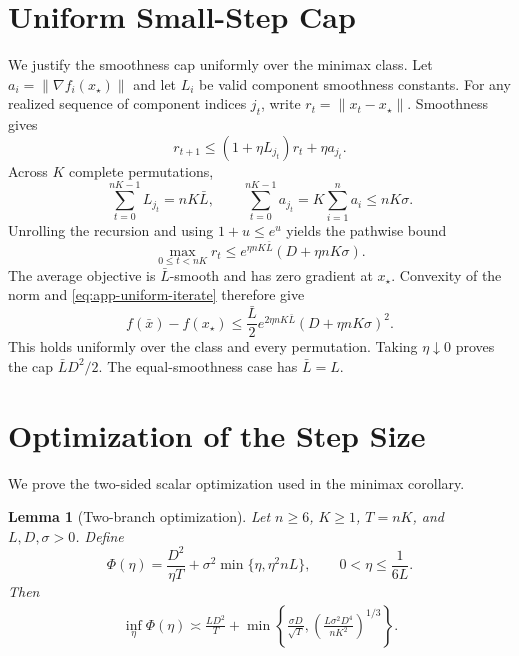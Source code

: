 \documentclass[twoside]{article}
\newtheorem{lemma}[theorem]{Lemma}
\begin{document}
\section{Uniform Small-Step Cap}
\label{app:cap}

We justify the smoothness cap uniformly over the minimax class. Let
$a_i=\|\nabla f_i(x_\star)\|$ and let $L_i$ be valid component smoothness
constants. For any realized sequence of component indices $j_t$, write
$r_t=\|x_t-x_\star\|$. Smoothness gives
\begin{equation}
 r_{t+1}\le(1+\eta L_{j_t})r_t+\eta a_{j_t}.
\end{equation}
Across $K$ complete permutations,
\begin{equation}
 \sum_{t=0}^{nK-1}L_{j_t}=nK\bar L,
 \qquad
 \sum_{t=0}^{nK-1}a_{j_t}
 =K\sum_{i=1}^na_i\le nK\sigma.
\end{equation}
Unrolling the recursion and using $1+u\le e^u$ yields the pathwise bound
\begin{equation}
 \max_{0\le t<nK}r_t
 \le e^{\eta nK\bar L}(D+\eta nK\sigma).             \label{eq:app-uniform-iterate}
\end{equation}
The average objective is $\bar L$-smooth and has zero gradient at
$x_\star$. Convexity of the norm and \eqref{eq:app-uniform-iterate} therefore
give
\begin{equation}
 f(\bar x)-f(x_\star)
 \le\frac{\bar L}{2}e^{2\eta nK\bar L}
 (D+\eta nK\sigma)^2.                                \label{eq:app-uniform-cap}
\end{equation}
This holds uniformly over the class and every permutation. Taking
$\eta\downarrow0$ proves the cap $\bar LD^2/2$. The equal-smoothness case has
$\bar L=L$.

\section{Optimization of the Step Size}
\label{app:optimization}

We prove the two-sided scalar optimization used in the minimax corollary.

\begin{lemma}[Two-branch optimization]
\label{lem:app-opt}
Let $n\ge6$, $K\ge1$, $T=nK$, and $L,D,\sigma>0$. Define
\begin{equation}
 \Phi(\eta)=\frac{D^2}{\eta T}
 +\sigma^2\min\{\eta,\eta^2nL\},
 \qquad 0<\eta\le\frac1{6L}.
\end{equation}
Then
\begin{align}
 \inf_\eta\Phi(\eta)
 \asymp \frac{LD^2}{T}
 +\min\left\{\frac{\sigma D}{\sqrt T},
 \left(\frac{L\sigma^2D^4}{nK^2}\right)^{1/3}\right\}.          \label{eq:app-opt}
\end{align}
\end{lemma}
\end{document}
